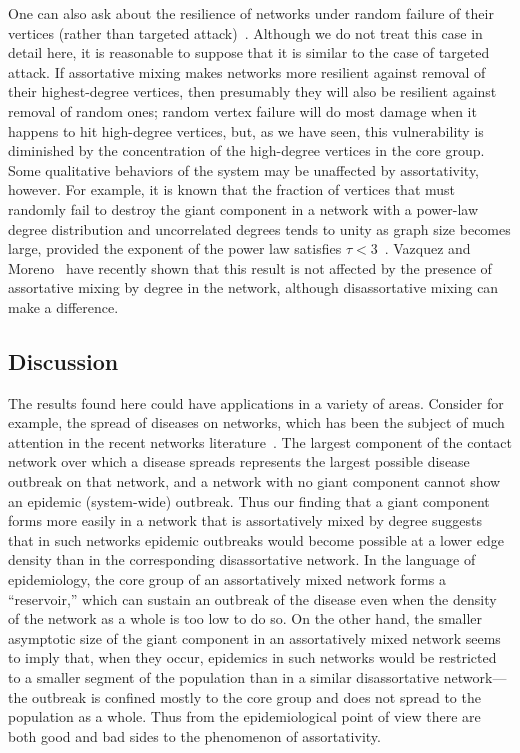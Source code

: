 \documentclass[twocolumn,pre]{revtex4}
\begin{document}
One can also ask about the resilience of networks under random failure of
their vertices (rather than targeted attack)~\cite{AJB00,CEBH00,CNSW00}.
Although we do not treat this case in detail here, it is reasonable to
suppose that it is similar to the case of targeted attack.  If assortative
mixing makes networks more resilient against removal of their
highest-degree vertices, then presumably they will also be resilient
against removal of random ones; random vertex failure will do most damage
when it happens to hit high-degree vertices, but, as we have seen, this
vulnerability is diminished by the concentration of the high-degree
vertices in the core group.  Some qualitative behaviors of the system may
be unaffected by assortativity, however.  For example, it is known that the
fraction of vertices that must randomly fail to destroy the giant component
in a network with a power-law degree distribution and uncorrelated degrees
tends to unity as graph size becomes large, provided the exponent of the
power law satisfies $\tau<3$~\cite{CEBH00}.  Vazquez and
Moreno~\cite{VM03} have recently shown that this result is not affected by
the presence of assortative mixing by degree in the network, although
disassortative mixing can make a difference.


\subsection{Discussion}
The results found here could have applications in a variety of areas.
Consider for example, the spread of diseases on networks, which has been
the subject of much attention in the recent networks
literature~\cite{BMS97,Andersson99,MN00a,PV01a,PV01b,ML01,Sander02,Newman02c}.
The largest component of the contact network over which a disease spreads
represents the largest possible disease outbreak on that network, and a
network with no giant component cannot show an epidemic (system-wide)
outbreak.  Thus our finding that a giant component forms more easily in a
network that is assortatively mixed by degree suggests that in such
networks epidemic outbreaks would become possible at a lower edge density
than in the corresponding disassortative network.  In the language of
epidemiology, the core group of an assortatively mixed network forms a
``reservoir,'' which can sustain an outbreak of the disease even when the
density of the network as a whole is too low to do so.  On the other hand,
the smaller asymptotic size of the giant component in an assortatively
mixed network seems to imply that, when they occur, epidemics in such
networks would be restricted to a smaller segment of the population than in
a similar disassortative network---the outbreak is confined mostly to the
core group and does not spread to the population as a whole.  Thus from the
epidemiological point of view there are both good and bad sides to the
phenomenon of assortativity.
\end{document}
